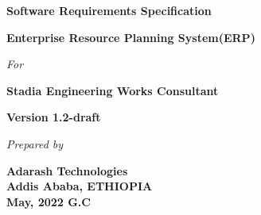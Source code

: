 \begin{titlepage}
\begin{center}
		\begin{LARGE}
			\bf{Software Requirements Specification}
		\end{LARGE}
		\vspace*{30pt}
		
		{\large \textbf{Enterprise Resource Planning System(ERP)}}
		\vspace{1.5\baselineskip}
		
		\textit{For}
		\vspace{1.5\baselineskip}
		
		{\large \textbf{Stadia Engineering Works Consultant}}
		\vspace{1.5\baselineskip}	
		
		{\large \textbf{Version 1.2-draft}}
		\vspace{3.5\baselineskip}
		
		
		\vspace{15\baselineskip}
		
		\textit{Prepared by}
		
		\textbf{Adarash Technologies\\
			Addis Ababa, ETHIOPIA\\
			May, 2022 G.C
		}
	
	\end{center}
\end{titlepage}